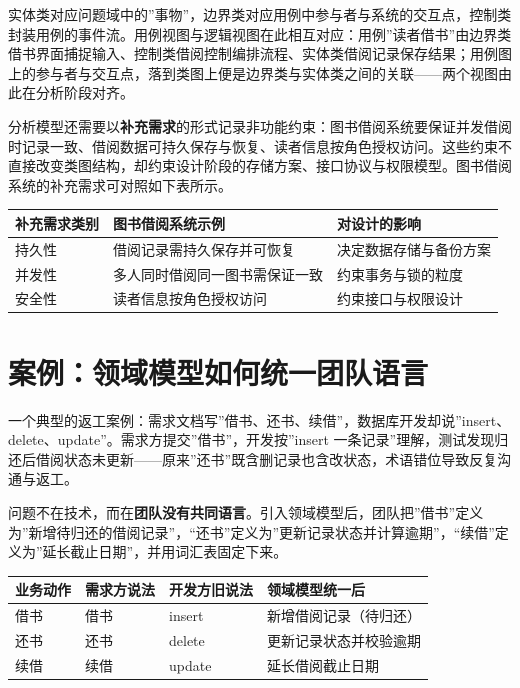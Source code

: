 \documentclass[
]{ctexbook}
\newcounter{none}
\begin{document}
实体类对应问题域中的''事物''，边界类对应用例中参与者与系统的交互点，控制类封装用例的事件流。用例视图与逻辑视图在此相互对应：用例''读者借书''由边界类借书界面捕捉输入、控制类借阅控制编排流程、实体类借阅记录保存结果；用例图上的参与者与交互点，落到类图上便是边界类与实体类之间的关联------两个视图由此在分析阶段对齐。

分析模型还需要以\textbf{补充需求}的形式记录非功能约束：图书借阅系统要保证并发借阅时记录一致、借阅数据可持久保存与恢复、读者信息按角色授权访问。这些约束不直接改变类图结构，却约束设计阶段的存储方案、接口协议与权限模型。图书借阅系统的补充需求可对照如下表所示。

{\def\LTcaptype{none} %
\begin{longtable}[]{@{}lll@{}}
\toprule\noalign{}
补充需求类别 & 图书借阅系统示例 & 对设计的影响 \\
\midrule\noalign{}
\endhead
\bottomrule\noalign{}
\endlastfoot
持久性 & 借阅记录需持久保存并可恢复 & 决定数据存储与备份方案 \\
并发性 & 多人同时借阅同一图书需保证一致 & 约束事务与锁的粒度 \\
安全性 & 读者信息按角色授权访问 & 约束接口与权限设计 \\
\end{longtable}
}

\section{案例：领域模型如何统一团队语言}\label{ux6848ux4f8bux9886ux57dfux6a21ux578bux5982ux4f55ux7edfux4e00ux56e2ux961fux8bedux8a00}

一个典型的返工案例：需求文档写''借书、还书、续借''，数据库开发却说''insert、delete、update''。需求方提交''借书''，开发按''insert
一条记录''理解，测试发现归还后借阅状态未更新------原来''还书''既含删记录也含改状态，术语错位导致反复沟通与返工。

问题不在技术，而在\textbf{团队没有共同语言}。引入领域模型后，团队把''借书''定义为''新增待归还的借阅记录''，``还书''定义为''更新记录状态并计算逾期''，``续借''定义为''延长截止日期''，并用词汇表固定下来。

{\def\LTcaptype{none} %
\begin{longtable}[]{@{}llll@{}}
\toprule\noalign{}
业务动作 & 需求方说法 & 开发方旧说法 & 领域模型统一后 \\
\midrule\noalign{}
\endhead
\bottomrule\noalign{}
\endlastfoot
借书 & 借书 & insert & 新增借阅记录（待归还） \\
还书 & 还书 & delete & 更新记录状态并校验逾期 \\
续借 & 续借 & update & 延长借阅截止日期 \\
\end{longtable}
}
\end{document}
